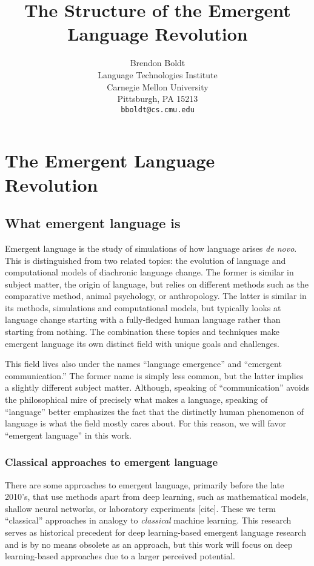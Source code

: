 \documentclass[letterpaper]{report}
\title{The Structure of the Emergent Language Revolution}
\author{%
  Brendon Boldt\\
  Language Technologies Institute\\
  Carnegie Mellon University\\
  Pittsburgh, PA 15213 \\
  \texttt{bboldt@cs.cmu.edu} \\
}
\newcommand\cmg[1]{{\color{gray}[#1]}}
\begin{document}
\maketitle

\tableofcontents



\chapter{The Emergent Language Revolution}
\section{What emergent language is}
Emergent language is the study of simulations of how language arises \emph{de novo}.
This is distinguished from two related topics: the evolution of language and computational models of diachronic language change.
The former is similar in subject matter, the origin of language, but relies on different methods such as the comparative method, animal psychology, or anthropology.
The latter is similar in its methods, simulations and computational models, but typically looks at language change starting with a fully-fledged human language rather than starting from nothing.
The combination these topics and techniques make emergent language its own distinct field with unique goals and challenges.

This field lives also under the names ``language emergence'' and ``emergent communication.''
The former name is simply less common, but the latter implies a slightly different subject matter.
Although, speaking of ``communication'' avoids the philosophical mire of precisely what makes a language, speaking of ``language'' better emphasizes the fact that the distinctly human phenomenon of language is what the field mostly cares about.
For this reason, we will favor ``emergent language'' in this work.

\subsection{Classical approaches to emergent language}
There are some approaches to emergent language, primarily before the late 2010's, that use methods apart from deep learning, such as mathematical models, shallow neural networks, or laboratory experiments \cmg{cite}.
These we term ``classical'' approaches in analogy to \emph{classical} machine learning.
This research serves as historical precedent for deep learning-based emergent language research and is by no means obsolete as an approach, but this work will focus on deep learning-based approaches due to a larger perceived potential.
\end{document}
